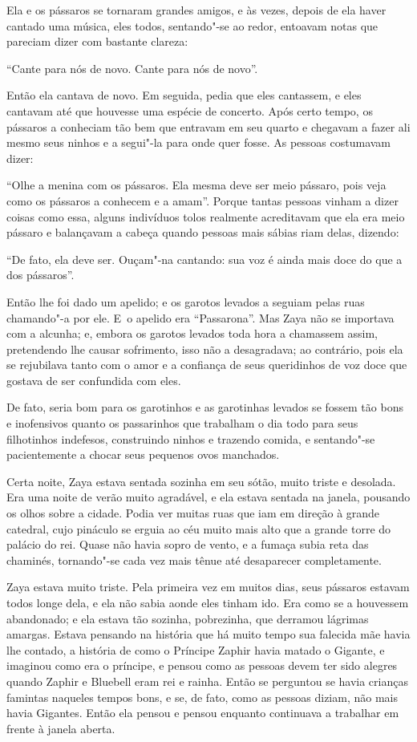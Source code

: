Ela e os pássaros se tornaram grandes amigos, e às vezes, depois de ela
haver cantado uma música, eles todos, sentando"-se ao redor, entoavam
notas que pareciam dizer com bastante clareza:

``Cante para nós de novo. Cante para nós de novo''.

Então ela cantava de novo. Em seguida, pedia que eles cantassem, e eles
cantavam até que houvesse uma espécie de concerto. Após certo tempo, os
pássaros a conheciam tão bem que entravam em seu quarto e chegavam a
fazer ali mesmo seus ninhos e a segui"-la para onde quer fosse. As
pessoas costumavam dizer:

``Olhe a menina com os pássaros. Ela mesma deve ser meio pássaro, pois
veja como os pássaros a conhecem e a amam''. Porque tantas pessoas vinham a
dizer coisas como essa, alguns indivíduos tolos realmente acreditavam
que ela era meio pássaro e balançavam a cabeça quando pessoas mais
sábias riam delas, dizendo:

``De fato, ela deve ser. Ouçam"-na cantando: sua voz é ainda mais doce do
que a dos pássaros''.

Então lhe foi dado um apelido; e os garotos levados a seguiam pelas ruas
chamando"-a por ele. E~o apelido era ``Passarona''. Mas Zaya não se
importava com a alcunha; e, embora os garotos levados toda hora a
chamassem assim, pretendendo lhe causar sofrimento, isso não a
desagradava; ao contrário, pois ela se rejubilava tanto com o amor e a
confiança de seus queridinhos de voz doce que gostava de ser confundida
com eles.

De fato, seria bom para os garotinhos e as garotinhas levados se fossem
tão bons e inofensivos quanto os passarinhos que trabalham o dia todo
para seus filhotinhos indefesos, construindo ninhos e trazendo comida, e
sentando"-se pacientemente a chocar seus pequenos ovos manchados.

Certa noite, Zaya estava sentada sozinha em seu sótão, muito triste e
desolada. Era uma noite de verão muito agradável, e ela estava sentada
na janela, pousando os olhos sobre a cidade. Podia ver muitas ruas que
iam em direção à grande catedral, cujo pináculo se erguia ao céu muito
mais alto que a grande torre do palácio do rei. Quase não havia sopro de
vento, e a fumaça subia reta das chaminés, tornando"-se cada vez mais
tênue até desaparecer completamente.


Zaya estava muito triste. Pela primeira vez em muitos dias, seus
pássaros estavam todos longe dela, e ela não sabia aonde eles tinham ido.
Era como se a houvessem abandonado; e ela estava tão sozinha,
pobrezinha, que derramou lágrimas amargas. Estava pensando na história
que há muito tempo sua falecida mãe havia lhe contado, a história de
como o Príncipe Zaphir havia matado o Gigante, e imaginou como era o
príncipe, e pensou como as pessoas devem ter sido alegres quando Zaphir
e Bluebell eram rei e rainha. Então se perguntou se havia crianças
famintas naqueles tempos bons, e se, de fato, como as pessoas diziam,
não mais havia Gigantes. Então ela pensou e pensou enquanto continuava a
trabalhar em frente à janela aberta.

